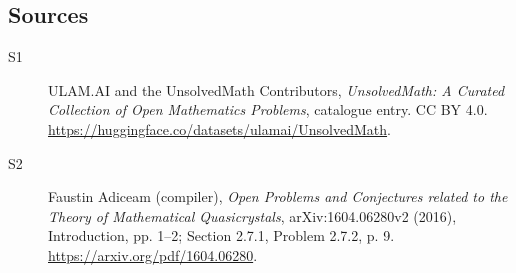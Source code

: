 \documentclass[11pt]{article}
\begin{document}
\subsection{Sources}
\begin{description}
\item[\hypertarget{source:statement:1}{S1}] ULAM.AI and the UnsolvedMath Contributors, \emph{UnsolvedMath: A Curated Collection of Open Mathematics Problems}, catalogue entry. CC BY 4.0. \url{https://huggingface.co/datasets/ulamai/UnsolvedMath}.
\item[\hypertarget{source:statement:2}{S2}] Faustin Adiceam (compiler), \emph{Open Problems and Conjectures related to the Theory of Mathematical Quasicrystals}, arXiv:1604.06280v2 (2016), Introduction, pp. 1--2; Section 2.7.1, Problem 2.7.2, p. 9. \url{https://arxiv.org/pdf/1604.06280}.
\end{description}
\label{end:statement}
\end{document}

